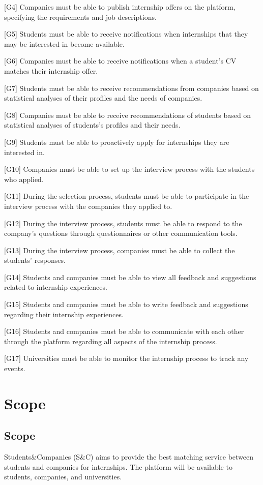 [G4] Companies must be able to publish internship offers on the platform, specifying the requirements and job descriptions.

[G5] Students must be able to receive notifications when internships that they may be interested in become available.

[G6] Companies must be able to receive notifications when a student's CV matches their internship offer.

[G7] Students must be able to receive recommendations from companies based on statistical analyses of their profiles and the needs of companies.

[G8] Companies must be able to receive recommendations of students based on statistical analyses of students's profiles and their needs.

[G9] Students must be able to proactively apply for internships they are interested in.

[G10] Companies must be able to set up the interview process with the students who applied.

[G11] During the selection process, students must be able to participate in the interview process with the companies they applied to.

[G12] During the interview process, students must be able to respond to the company's questions through questionnaires or other communication tools.

[G13] During the interview process, companies must be able to collect the students' responses.

[G14] Students and companies must be able to view all feedback and suggestions related to internship experiences.

[G15] Students and companies must be able to write feedback and suggestions regarding their internship experiences.

[G16] Students and companies must be able to communicate with each other through the platform regarding all aspects of the internship process.

[G17] Universities must be able to monitor the internship process to track any events. 


\newpage
\section{Scope}
\label{sec:scope}
\subsection{Scope}
\label{subsec:scope}
Students\&Companies (S\&C) aims to provide the best matching service between students and companies for internships. The platform will be available
to students, companies, and universities.

